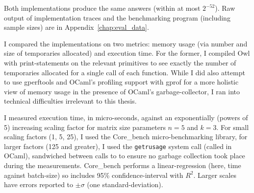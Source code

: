 Both implementations produce the same answers (within at most $2^{-52}$). Raw
output of implementation traces and the benchmarking program (including sample
sizes) are in Appendix~\ref{chap:eval_data}.

I compared the implementations on two metrics: memory usage (via number and
size of temporaries allocated) and execution time. For the former, I compiled
Owl with print-statements on the relevant primitives to see exactly the number
of temporaries allocated for a single call of each function. While I did also
attempt to use gperftools and OCaml's profiling support with gprof for a more
holistic view of memory usage in the presence of OCaml's garbage-collector, I
ran into technical difficulties irrelevant to this thesis.

I measured execution time, in micro-seconds, against an exponentially (powers
of 5) increasing scaling factor for matrix size parameters $n=5$ and $k=3$.
For small scaling factors (1, 5, 25), I used the Core\_bench micro-benchmarking
library, for larger factors (125 and greater), I used the \texttt{getrusage}
system call (called  in OCaml), sandwiched between calls to
 to ensure no garbage collection took place during the
measurements.  Core\_bench performs a linear-regression (here, time against
batch-size) so includes 95\% confidence-interval with $R^2$. Larger scales have
errors reported to $\pm \sigma$ (one standard-deviation).

